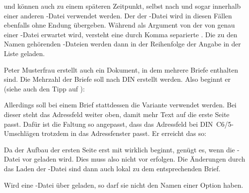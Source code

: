  und  können auch zu einem
späteren Zeitpunkt, selbst nach  und sogar
innerhalb einer anderen -Datei verwendet werden.  Der 
der -Datei wird in diesen Fällen ebenfalls ohne Endung
übergeben. Während als Argument von  der 
von genau einer -Datei erwartet wird, versteht
 eine durch Komma separierte . Die zu den Namen gehörenden -Dateien werden dann in der
Reihenfolge der Angabe in der Liste geladen.
\begin{Example}
  Peter Musterfrau erstellt auch ein Dokument, in dem mehrere Briefe enthalten
  sind. Die Mehrzahl der Briefe soll nach DIN erstellt werden. Also
  beginnt er (siehe auch den Tipp auf ):
  Allerdings soll bei einem Brief stattdessen die Variante
   verwendet werden. Bei dieser steht das Adressfeld
  weiter oben, damit mehr Text auf die erste Seite passt. Dafür ist
  die Faltung so angepasst, dass das Adressfeld bei
  DIN~C6/5-Umschlägen trotzdem in das Adressfenster passt. Er
  erreicht das so:
  Da der Aufbau der ersten Seite erst mit
   wirklich beginnt, genügt
  es, wenn die -Datei vor  geladen
  wird. Dies muss also nicht vor 
  erfolgen. Die Änderungen durch das Laden der -Datei sind dann auch
  lokal zu dem entsprechenden Brief.
\end{Example}

Wird eine -Datei über
 geladen, so darf sie nicht den Namen einer Option
haben.

